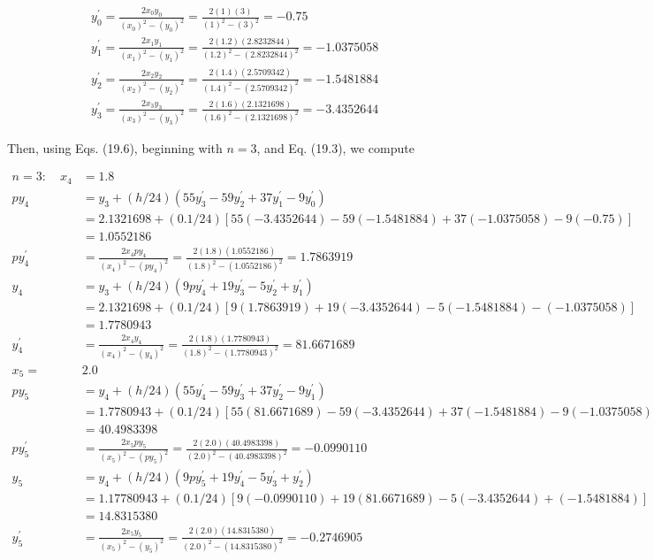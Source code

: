\documentclass[10pt]{article}
\begin{document}
$$
\begin{aligned}
& y_{0}^{\prime}=\frac{2 x_{0} y_{0}}{\left(x_{0}\right)^{2}-\left(y_{0}\right)^{2}}=\frac{2(1)(3)}{(1)^{2}-(3)^{2}}=-0.75 \\
& y_{1}^{\prime}=\frac{2 x_{1} y_{1}}{\left(x_{1}\right)^{2}-\left(y_{1}\right)^{2}}=\frac{2(1.2)(2.8232844)}{(1.2)^{2}-(2.8232844)^{2}}=-1.0375058 \\
& y_{2}^{\prime}=\frac{2 x_{2} y_{2}}{\left(x_{2}\right)^{2}-\left(y_{2}\right)^{2}}=\frac{2(1.4)(2.5709342)}{(1.4)^{2}-(2.5709342)^{2}}=-1.5481884 \\
& y_{3}^{\prime}=\frac{2 x_{3} y_{3}}{\left(x_{3}\right)^{2}-\left(y_{3}\right)^{2}}=\frac{2(1.6)(2.1321698)}{(1.6)^{2}-(2.1321698)^{2}}=-3.4352644
\end{aligned}
$$

Then, using Eqs. (19.6), beginning with $n=3$, and Eq. (19.3), we compute

$$
\begin{aligned}
n=3: \quad x_{4} & =1.8 \\
p y_{4} & =y_{3}+(h / 24)\left(55 y_{3}^{\prime}-59 y_{2}^{\prime}+37 y_{1}^{\prime}-9 y_{0}^{\prime}\right) \\
& =2.1321698+(0.1 / 24)[55(-3.4352644)-59(-1.5481884)+37(-1.0375058)-9(-0.75)] \\
& =1.0552186 \\
p y_{4}^{\prime} & =\frac{2 x_{4} p y_{4}}{\left(x_{4}\right)^{2}-\left(p y_{4}\right)^{2}}=\frac{2(1.8)(1.0552186)}{(1.8)^{2}-(1.0552186)^{2}}=1.7863919 \\
y_{4} & =y_{3}+(h / 24)\left(9 p y_{4}^{\prime}+19 y_{3}^{\prime}-5 y_{2}^{\prime}+y_{1}^{\prime}\right) \\
& =2.1321698+(0.1 / 24)[9(1.7863919)+19(-3.4352644)-5(-1.5481884)-(-1.0375058)] \\
& =1.7780943 \\
y_{4}^{\prime} & =\frac{2 x_{4} y_{4}}{\left(x_{4}\right)^{2}-\left(y_{4}\right)^{2}}=\frac{2(1.8)(1.7780943)}{(1.8)^{2}-(1.7780943)^{2}}=81.6671689 \\
x_{5}= & 2.0 \\
p y_{5} & =y_{4}+(h / 24)\left(55 y_{4}^{\prime}-59 y_{3}^{\prime}+37 y_{2}^{\prime}-9 y_{1}^{\prime}\right) \\
& =1.7780943+(0.1 / 24)[55(81.6671689)-59(-3.4352644)+37(-1.5481884)-9(-1.0375058)] \\
& =40.4983398 \\
p y_{5}^{\prime} & =\frac{2 x_{5} p y_{5}}{\left(x_{5}\right)^{2}-\left(p y_{5}\right)^{2}}=\frac{2(2.0)(40.4983398)}{(2.0)^{2}-(40.4983398)^{2}}=-0.0990110 \\
y_{5} & =y_{4}+(h / 24)\left(9 p y_{5}^{\prime}+19 y_{4}^{\prime}-5 y_{3}^{\prime}+y_{2}^{\prime}\right) \\
& =1.17780943+(0.1 / 24)[9(-0.0990110)+19(81.6671689)-5(-3.4352644)+(-1.5481884)] \\
& =14.8315380 \\
y_{5}^{\prime} & =\frac{2 x_{5} y_{5}}{\left(x_{5}\right)^{2}-\left(y_{5}\right)^{2}}=\frac{2(2.0)(14.8315380)}{(2.0)^{2}-(14.8315380)^{2}}=-0.2746905
\end{aligned}
$$
\end{document}
